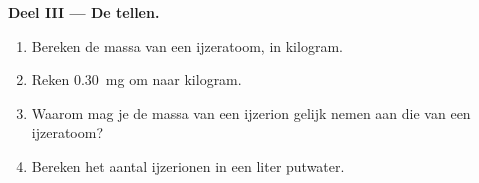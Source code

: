 \begin{problem}
\medskip
\noindent\textbf{Deel III --- De  tellen.}
\begin{enumerate}[resume]
  \item Bereken de massa van een ijzeratoom, in kilogram.
  \item Reken \qty{0.30}{mg} om naar kilogram.
  \item Waarom mag je de massa van een ijzerion gelijk nemen aan die van
        een ijzeratoom?
  \item Bereken het aantal ijzerionen in een liter putwater.
\end{enumerate}
\end{problem}
